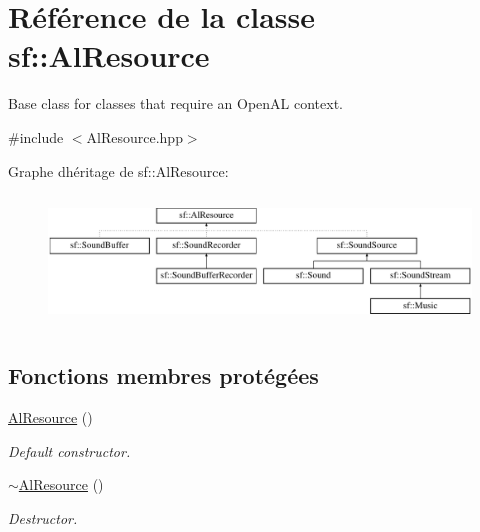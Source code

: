 \hypertarget{classsf_1_1AlResource}{}\section{Référence de la classe sf\+:\+:Al\+Resource}
\label{classsf_1_1AlResource}


Base class for classes that require an Open\+AL context.  




{\ttfamily \#include $<$Al\+Resource.\+hpp$>$}

Graphe d\textquotesingle{}héritage de sf\+:\+:Al\+Resource\+:\begin{figure}[H]
\begin{center}
\leavevmode
\includegraphics[height=3.500000cm]{classsf_1_1AlResource}
\end{center}
\end{figure}
\subsection*{Fonctions membres protégées}
\begin{DoxyCompactItemize}
\item 
\mbox{\label{classsf_1_1AlResource_a51b4f3a825c5d68386f8683e3e1053d7}} 
\hyperlink{classsf_1_1AlResource_a51b4f3a825c5d68386f8683e3e1053d7}{Al\+Resource} ()
\begin{DoxyCompactList}\small\item\em Default constructor. \end{DoxyCompactList}\item 
\mbox{\label{classsf_1_1AlResource_a74ad78198cddcb6e5d847177364049db}} 
\hyperlink{classsf_1_1AlResource_a74ad78198cddcb6e5d847177364049db}{$\sim$\+Al\+Resource} ()
\begin{DoxyCompactList}\small\item\em Destructor. \end{DoxyCompactList}\end{DoxyCompactItemize}


